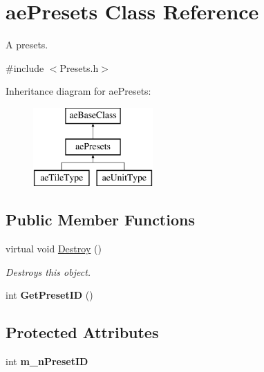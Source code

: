 \hypertarget{classae_presets}{}\section{ae\+Presets Class Reference}
\label{classae_presets}


A presets.  




{\ttfamily \#include $<$Presets.\+h$>$}

Inheritance diagram for ae\+Presets\+:\begin{figure}[H]
\begin{center}
\leavevmode
\includegraphics[height=3.000000cm]{classae_presets}
\end{center}
\end{figure}
\subsection*{Public Member Functions}
\begin{DoxyCompactItemize}
\item 
virtual void \hyperlink{classae_presets_ab3b99e89c0edc19b9dfcaa4f9dda4cac}{Destroy} ()\hypertarget{classae_presets_ab3b99e89c0edc19b9dfcaa4f9dda4cac}{}\label{classae_presets_ab3b99e89c0edc19b9dfcaa4f9dda4cac}

\begin{DoxyCompactList}\small\item\em Destroys this object. \end{DoxyCompactList}\item 
int {\bfseries Get\+Preset\+ID} ()\hypertarget{classae_presets_a2b2922ffc74513c8819ba5ddd161b449}{}\label{classae_presets_a2b2922ffc74513c8819ba5ddd161b449}

\end{DoxyCompactItemize}
\subsection*{Protected Attributes}
\begin{DoxyCompactItemize}
\item 
int {\bfseries m\+\_\+n\+Preset\+ID}\hypertarget{classae_presets_aff82b5232f037a495d85fe0decbbc61e}{}\label{classae_presets_aff82b5232f037a495d85fe0decbbc61e}

\end{DoxyCompactItemize}



